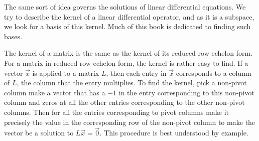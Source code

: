 The same sort of idea governs the solutions of linear differential
equations.  We try to describe the kernel of a linear differential 
operator, and as it is a subspace, we look for a basis of this
kernel.  Much of this book is dedicated to finding such bases.

The kernel of a matrix is the same as the kernel of its reduced row echelon
form.  For a matrix in reduced row echelon form, the kernel is rather easy to
find.  If a vector $\vec{x}$ is applied to a matrix $L$, then each entry in
$\vec{x}$ corresponds to a column of $L$, the column that the entry
multiplies.
To find the kernel,
pick a 
non-pivot column make a vector that has a $-1$ in the entry
corresponding to this non-pivot column and zeros at all the other entries
corresponding to the other non-pivot columns.
Then for all the entries
corresponding to pivot columns make it precisely the value in the
corresponding row of the non-pivot column to make the vector be a
solution to $L \vec{x} = \vec{0}$.
This procedure is best understood by example.

